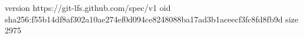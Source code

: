 version https://git-lfs.github.com/spec/v1
oid sha256:f55b14df8af302a10ae274ef0d094ce8248088ba17ad3b1aceecf3fc8fd8fb9d
size 2975
